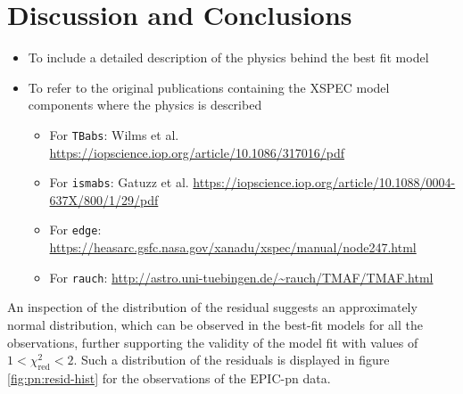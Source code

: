 \section{Discussion and Conclusions}
	
	\begin{itemize}
		\item To include a detailed description of the physics behind the best fit model
		\item To refer to the original publications containing the XSPEC model components where the physics is described
		\begin{itemize}
			\item For \texttt{TBabs}: Wilms et al. \url{https://iopscience.iop.org/article/10.1086/317016/pdf}
			\item For \texttt{ismabs}: Gatuzz et al. \url{https://iopscience.iop.org/article/10.1088/0004-637X/800/1/29/pdf}
			\item For \texttt{edge}: \url{https://heasarc.gsfc.nasa.gov/xanadu/xspec/manual/node247.html}
			\item For \texttt{rauch}: \url{http://astro.uni-tuebingen.de/~rauch/TMAF/TMAF.html}
		\end{itemize}
	\end{itemize}
	An inspection of the distribution of the residual suggests an approximately normal distribution, which can be observed in the best-fit models for all the observations, further supporting the validity of the model fit with values of $1<\chi^2_\text{red}<2$. Such a distribution of the residuals is displayed in figure \ref{fig:pn:resid-hist} for the observations of the EPIC-pn data.
	

